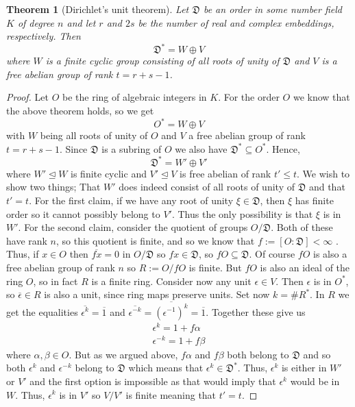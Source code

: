 \documentclass{article}
\newtheorem{theorem}{Theorem}[section]
\newcommand{\mfrak}[1]{\mathfrak{#1}}
\numberwithin{equation}{section}
\begin{document}
\begin{theorem}[Dirichlet's unit theorem]\label{thm: Generalized Dirichlet}
    Let $\mfrak D$ be an order in some number field $K$ of degree $n$ and let $r$ and $2s$ be the number of real and complex embeddings, respectively. Then $$\mfrak D^* = W \oplus V$$
    where $W$ is a finite cyclic group consisting of all roots of unity of $\mfrak D$ and $V$ is a free abelian group of rank $t = r + s - 1$.
\end{theorem}
\begin{proof}
    Let $O$ be the ring of algebraic integers in $K$. For the order $O$ we know that the above theorem holds, so we get
    $$O^* = W \oplus V$$
    with $W$ being all roots of unity of $O$ and $V$ a free abelian group of rank $t = r + s -1$. Since $\mfrak D$ is a subring of $O$ we also have $\mfrak D^* \subseteq O^*$. Hence, $$\mfrak D^* = W' \oplus V'$$
    where $W' \trianglelefteq W$ is finite cyclic and $V' \trianglelefteq V$ is free abelian of rank $t' \leq t$. We wish to show two things; That $W'$ does indeed consist of all roots of unity of $\mfrak D$ and that $t' = t$. For the first claim, if we have any root of unity $\xi \in \mfrak{D}$, then $\xi$ has finite order so it cannot possibly belong to $V'$. Thus the only possibility is that $\xi$ is in $W'$. For the second claim, consider the quotient of groups $O / \mfrak D$. Both of these have rank $n$, so this quotient is finite, and so we know that $f := [O : \mfrak D] < \infty$ . Thus, if $x \in O$ then $\overline {fx} = 0$ in $O / \mfrak D$ so $fx \in \mfrak D$, so $f O \subseteq \mfrak D$. Of course $f O$ is also a free abelian group of rank $n$ so $R := O / f O$ is finite. But $fO$ is also an ideal of the ring $O$, so in fact $R$ is a finite ring. Consider now any unit $\epsilon \in V$. Then $\epsilon$ is in $O^*$, so $\overline \epsilon \in R$ is also a unit, since ring maps preserve units. Set now $k = \# R^*$. In $R$ we get the equalities $\overline {\epsilon^k} = \overline 1$ and $\overline {\epsilon^{-k}} = \overline {(\epsilon^{-1})^k} = \overline 1$. Together these give us
    \begin{align*}
        \epsilon^k = 1 + f \alpha \\
        \epsilon^{-k} = 1 + f \beta
    \end{align*}
    where $\alpha, \beta \in O$. But as we argued above, $f \alpha$ and $f \beta$ both belong to $\mfrak D$ and so both $\epsilon^k$ and $\epsilon^{-k}$ belong to $\mfrak D$ which means that  $\epsilon^k \in \mfrak D^*$. Thus, $\epsilon^k$ is either in $W'$ or $V'$ and the first option is impossible as that would imply that $\epsilon^k$ would be in $W$. Thus, $\epsilon^k$ is in $V'$ so $V / V'$ is finite meaning that $t' = t$.
\end{proof}
\end{document}

